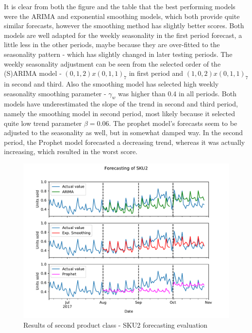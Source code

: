 \documentclass[11pt,a4paper]{article}
\begin{document}
It is clear from both the figure and the table that the best performing models were the ARIMA and exponential smoothing models, which both provide quite similar forecasts, however the smoothing method has slightly better scores. Both models are well adapted for the weekly seasonality in the first period forecast, a little less in the other periods, maybe because they are over-fitted to the seasonality pattern - which has slightly changed in later testing periods. The weekly seasonality adjustment can be seen from the selected order of the (S)ARIMA model - $(0,1,2)x(0,1,1)_7$ in first period and $(1,0,2)x(0,1,1)_7$ in second and third. Also the smoothing model has selected high weekly seasonality smoothing parameter - $\gamma_w$ was higher than 0.4 in all periods. Both models have underestimated the slope of the trend in second and third period, namely the smoothing model in second period, most likely because it selected quite low trend parameter $\beta = 0.06$.
The prophet model's forecasts seem to be adjusted to the seasonality as well, but in somewhat damped way. In the second period, the Prophet model forecasted a decreasing trend, whereas it was actually increasing, which resulted in the worst score.

\newpage
\begin{figure}
  \includegraphics[width=1\linewidth]{figures/SKU2_sep.pdf}
  \caption{Results of second product class - SKU2 forecasting evaluation}
  \label{fig:sku2_sep}
\end{figure}
\end{document}
